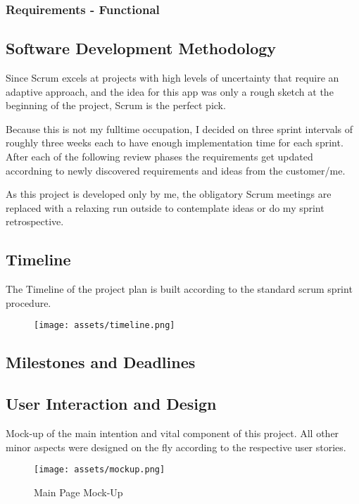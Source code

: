 \newpage
\subsubsection{Requirements - Functional}


\subsection{Software Development Methodology}
Since Scrum excels at projects with high levels of uncertainty that require an adaptive approach, and the idea for this app was only a rough sketch at the beginning of the project, Scrum is the perfect pick.

Because this is not my fulltime occupation, I decided on three sprint intervals of roughly three weeks each to have enough implementation time for each sprint. After each of the following review phases the requirements get updated accordning to newly discovered requirements and ideas from the customer/me.

As this project is developed only by me, the obligatory Scrum meetings are replaced with a relaxing run outside to contemplate ideas or do my sprint retrospective.

\subsection{Timeline}
The Timeline of the project plan is built according to the standard scrum sprint procedure.
\begin{figure}[!h]
    \centering
    \texttt{[image: assets/timeline.png]}
    \label{fig:timeline}
\end{figure}

\subsection{Milestones and Deadlines}


\newpage
\subsection{ User Interaction and Design}

Mock-up of the main intention and vital component of this project. All other minor aspects were designed on the fly according to the respective user stories.
\begin{figure}[!h]
    \centering
    \caption{Main Page Mock-Up}
    \texttt{[image: assets/mockup.png]}
    \label{fig:mockup}
\end{figure}

